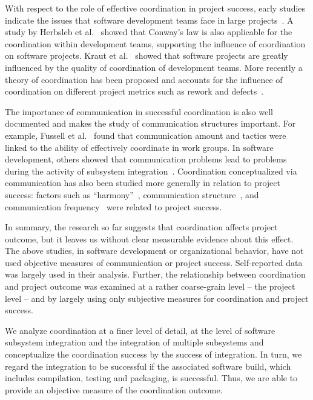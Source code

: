 With respect to the role of effective coordination in project success, early
studies indicate the issues that software development teams face in large
projects~\cite{curtis:acm:1988}. A study by Herbsleb et
al.~\cite{Herbsleb:1999ew} showed that Conway's law is also applicable for the
coordination within development teams, supporting the influence of coordination
on software projects. Kraut et al.~\cite{kraut:1995coordination} showed that
software projects are greatly influenced by the quality of coordination of
development teams. More recently a theory of coordination has been proposed and
accounts for the influence of coordination on different project metrics such as
rework and defects~\cite{Herbsleb:2006vn}.


The importance of communication in successful coordination is also well
documented and makes the study of communication structures important. For
example, Fussell et al.~\cite{fussell:cscw:1998} found that communication amount and
tactics were linked to the ability of effectively coordinate in work groups. In
software development, others showed that communication problems lead to problems
during the activity of subsystem
integration~\cite{Grinter:1999geography,deSouza2004:thwarts_collaboration}. Coordination
conceptualized via communication has also been studied more generally in relation
to project success: factors such as ``harmony''~\cite{Souder:1988jpim},
communication structure~\cite{Robin:1990jpim}, and communication
frequency~\cite{Griffin:1992ms} were related to project success.

In summary, the research so far suggests that coordination affects project
outcome, but it leaves us without clear measurable evidence about this effect.
The above studies, in software development or organizational behavior, have not
used objective measures of communication or project success. Self-reported data
was largely used in their analysis. Further, the relationship between
coordination and project outcome was examined at a rather coarse-grain level --
the project level -- and by largely using only subjective measures for
coordination and project success.

We analyze coordination at a finer level of detail, at the level of software
subsystem integration and the integration of multiple subsystems and
conceptualize the coordination success by the success of integration. In turn, we
regard the integration to be successful if the associated software build, which
includes compilation, testing and packaging, is successful. Thus, we are able to
provide an objective measure of the coordination outcome.


